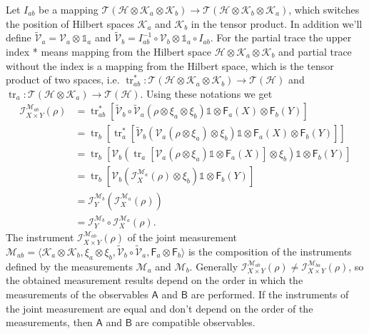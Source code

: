 \documentclass[a4paper,12pt]{wihuri}
\theoremstyle{definition}
\numberwithin{definition}{section}
\numberwithin{example}{section}
\numberwithin{theorem}{section}
\numberwithin{proposition}{section}
\numberwithin{lemma}{section}
\newcommand{\I}{\mathcal{I}}%
\newcommand{\hi}{\mathcal{H}}%
\newcommand{\ki}{\mathcal{K}}%
\newcommand{\tc}{\mathcal{T}}%
\newcommand{\mm}{\mathcal{M}}%
\newcommand{\V}{\mathcal{V}}%
\newcommand{\A}{\mathsf{A}}%
\newcommand{\B}{\mathsf{B}}%
\newcommand{\F}{\mathsf{F}}%
\newcommand{\id}{\mathds{1}}
\DeclareMathOperator{\tr}{tr}
\begin{document}
Let $I_{ab}$ be a mapping $\tc(\hi \otimes \ki_a \otimes \ki_b) \rightarrow \tc(\hi \otimes \ki_b \otimes \ki_a)$, which switches the position of Hilbert spaces $\ki_a$ and $\ki_b$ in the tensor product. In addition we'll define $\widetilde{\V}_a = \V_a \otimes \id_a$ and $\widetilde{\V}_b = I_{ab}^{-1} \circ \V_b \otimes \id_a \circ I_{ab}$. For the partial trace the upper index * means mapping from the Hilbert space $\hi \otimes \ki_a \otimes \ki_b$ and partial trace without the index is a mapping from the Hilbert space, which is the tensor product of two spaces, i.e. $\tr_{ab}^* :\tc(\hi \otimes \ki_a \otimes \ki_b) \rightarrow \tc(\hi)$ and $\tr_a :\tc(\hi \otimes \ki_a) \rightarrow \tc(\hi)$. Using these notations we get 
\begin{align*}
\I_{X\times Y}^{\mm_{ab}}(\rho) &= \tr_{ab}^*[\widetilde{\V}_b \circ \widetilde{\V}_a(\rho \otimes \xi_a \otimes \xi_b)\id \otimes \F_a(X) \otimes \F_b(Y)] \\
&= \tr_b[\tr_a^*[\widetilde{\V}_b(\V_a(\rho \otimes \xi_a)\otimes \xi_b)\id \otimes \F_a(X) \otimes \F_b(Y)]] \\
&= \tr_b[\V_b(\tr_a[\V_a(\rho \otimes \xi_a)\id \otimes \F_a(X)]\otimes \xi_b)\id \otimes \F_b(Y)] \\
&= \tr_b[\V_b(\I_X^{\mm_a}(\rho)\otimes \xi_b)\id \otimes \F_b(Y)] \\
&= \I_Y^{\mm_b}(\I_X^{\mm_a}(\rho)) \\
&= \I_Y^{\mm_b} \circ \I_X^{\mm_a}(\rho)\text{.}
\end{align*}
The instrument $\I_{X\times Y}^{\mm_{ab}}(\rho)$ of the joint measurement $\mm_{ab} = \langle\ki_a \otimes \ki_b , \xi_a \otimes \xi_b , \widetilde{\V}_b \circ \widetilde{\V}_a  , \F_a \otimes \F_b \rangle$ is the composition of the instruments defined by the measurements $\mm_a$ and $\mm_b$. Generally $\I_{X\times Y}^{\mm_{ab}}(\rho) \neq \I_{X\times Y}^{\mm_{ba}}(\rho)$, so the obtained measurement results depend on the order in which the measurements of the observables $\A$ and $\B$ are performed. If the instruments of the joint measurement are equal and don't depend on the order of the measurements, then $\A$ and $\B$ are compatible observables.
\end{document}
